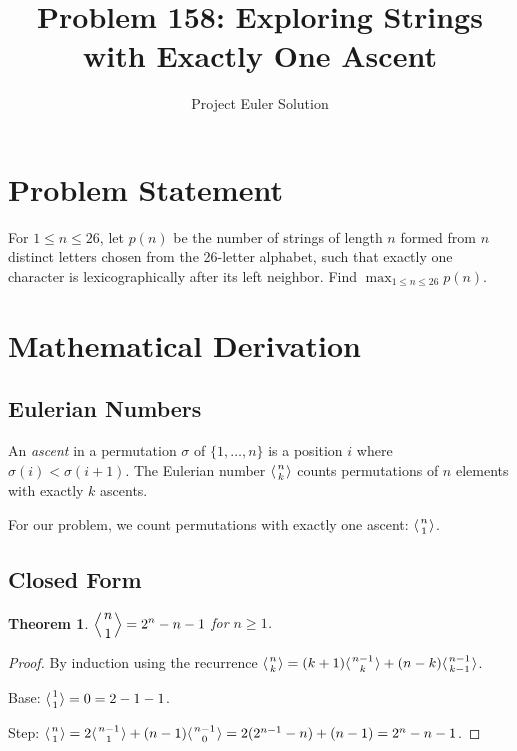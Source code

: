 \documentclass[12pt,a4paper]{article}
\title{Problem 158: Exploring Strings with Exactly One Ascent}
\author{Project Euler Solution}
\date{}
\newtheorem{theorem}{Theorem}
\theoremstyle{definition}
\begin{document}
\maketitle

\section{Problem Statement}

For $1 \le n \le 26$, let $p(n)$ be the number of strings of length $n$ formed from $n$ distinct letters chosen from the 26-letter alphabet, such that exactly one character is lexicographically after its left neighbor. Find $\max_{1 \le n \le 26} p(n)$.

\section{Mathematical Derivation}

\subsection{Eulerian Numbers}

An \emph{ascent} in a permutation $\sigma$ of $\{1, \ldots, n\}$ is a position $i$ where $\sigma(i) < \sigma(i+1)$. The Eulerian number $\langle {n \atop k} \rangle$ counts permutations of $n$ elements with exactly $k$ ascents.

For our problem, we count permutations with exactly one ascent: $\langle {n \atop 1} \rangle$.

\subsection{Closed Form}

\begin{theorem}
$\displaystyle\left\langle {n \atop 1} \right\rangle = 2^n - n - 1$ for $n \ge 1$.
\end{theorem}

\begin{proof}
By induction using the recurrence $\langle {n \atop k} \rangle = (k+1)\langle {n-1 \atop k} \rangle + (n-k)\langle {n-1 \atop k-1} \rangle$.

Base: $\langle {1 \atop 1} \rangle = 0 = 2 - 1 - 1$.

Step: $\langle {n \atop 1} \rangle = 2\langle {n-1 \atop 1} \rangle + (n-1)\langle {n-1 \atop 0} \rangle = 2(2^{n-1} - n) + (n-1) = 2^n - n - 1$.
\end{proof}
\end{document}

